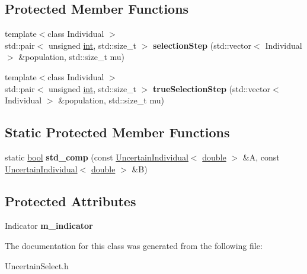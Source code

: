 \subsection*{Protected Member Functions}
\begin{DoxyCompactItemize}
\item 
{\footnotesize template$<$class Individual $>$ }\\std\+::pair$<$ unsigned \hyperlink{classint}{int}, std\+::size\+\_\+t $>$ {\bfseries selection\+Step} (std\+::vector$<$ Individual $>$ \&population, std\+::size\+\_\+t mu)\hypertarget{classUncertainSelection_a2d68dd6873aa0780dd73f4e4b0aea62e}{}\label{classUncertainSelection_a2d68dd6873aa0780dd73f4e4b0aea62e}

\item 
{\footnotesize template$<$class Individual $>$ }\\std\+::pair$<$ unsigned \hyperlink{classint}{int}, std\+::size\+\_\+t $>$ {\bfseries true\+Selection\+Step} (std\+::vector$<$ Individual $>$ \&population, std\+::size\+\_\+t mu)\hypertarget{classUncertainSelection_aa361423770aca0897984c3a397cf7461}{}\label{classUncertainSelection_aa361423770aca0897984c3a397cf7461}

\end{DoxyCompactItemize}
\subsection*{Static Protected Member Functions}
\begin{DoxyCompactItemize}
\item 
static \hyperlink{classbool}{bool} {\bfseries std\+\_\+comp} (const \hyperlink{classUncertainIndividual}{Uncertain\+Individual}$<$ \hyperlink{classdouble}{double} $>$ \&A, const \hyperlink{classUncertainIndividual}{Uncertain\+Individual}$<$ \hyperlink{classdouble}{double} $>$ \&B)\hypertarget{classUncertainSelection_ac1111f4abd8f1dc0a5ecb795b9c24ece}{}\label{classUncertainSelection_ac1111f4abd8f1dc0a5ecb795b9c24ece}

\end{DoxyCompactItemize}
\subsection*{Protected Attributes}
\begin{DoxyCompactItemize}
\item 
Indicator {\bfseries m\+\_\+indicator}\hypertarget{classUncertainSelection_ab71c199589c4bbb9239bac04823edc1c}{}\label{classUncertainSelection_ab71c199589c4bbb9239bac04823edc1c}

\end{DoxyCompactItemize}


The documentation for this class was generated from the following file\+:\begin{DoxyCompactItemize}
\item 
Uncertain\+Select.\+h\end{DoxyCompactItemize}

